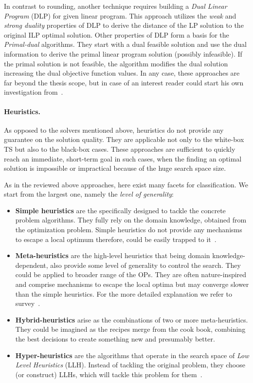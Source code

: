 In contrast to rounding, another technique requires building a \emph{Dual Linear Program} (DLP) for given linear program. This approach utilizes the \emph{weak} and \emph{strong duality} properties of DLP to derive the distance of the LP solution to the original ILP optimal solution. Other properties of DLP form a basis for the \emph{Primal-dual} algorithms. They start with a dual feasible solution and use the dual information to derive the primal linear program solution (possibly infeasible). If the primal solution is not feasible, the algorithm modifies the dual solution increasing the dual objective function values. In any case, these approaches are far beyond the thesis scope, but in case of an interest reader could start his own investigation from~\cite{williamson2011design}. 

\paragraph{Heuristics.} As opposed to the solvers mentioned above, heuristics do not provide any guarantee on the solution quality. They are applicable not only to the white-box TS but also to the black-box cases. These approaches are sufficient to quickly reach an immediate, short-term goal in such cases, when the finding an optimal solution is impossible or impractical because of the huge search space size.

As in the reviewed above approaches, here exist many facets for classification.
We start from the largest one, namely the \textit{level of generality}:
\begin{itemize}
	\item \textbf{Simple heuristics} are the specifically designed to tackle the concrete problem algorithms. They fully rely on the domain knowledge, obtained from the optimization problem. Simple heuristics do not provide any mechanisms to escape a local optimum therefore, could be easily trapped to it~\cite{pearl1984intelligent}.
	
	\item \textbf{Meta-heuristics} are the high-level heuristics that being domain knowledge-dependent, also provide some level of generality to control the search. They could be applied to broader range of the OPs. They are often nature-inspired and comprise mechanisms to escape the local optima but may converge slower than the simple heuristics. For the more detailed explanation we refer to survey~\cite{bianchi2009survey}.
	
	\item \textbf{Hybrid-heuristics} arise as the combinations of two or more meta-heuristics. They could be imagined as the recipes merge from the cook book, combining the best decisions to create something new and presumably better.
	
	\item \textbf{Hyper-heuristics} are the algorithms that operate in the search space of \emph{Low Level Heuristics} (LLH). Instead of tackling the original problem, they choose (or construct) LLHs, which will tackle this problem for them~\cite{burke2003hyper}. 
\end{itemize}

